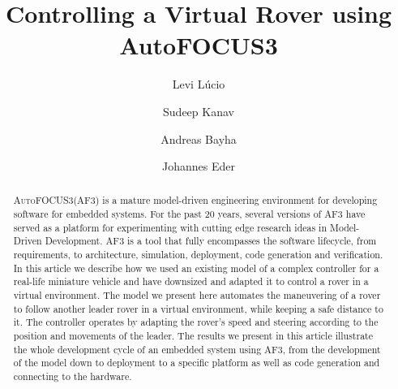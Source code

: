 \documentclass[runningheads]{llncs}
\newcommand{\af}{\textsc{AF3}\xspace}
\newcommand{\autofocus}{\textsc{AutoFOCUS3}\xspace}
\begin{document}
 
% 
\title{Controlling a Virtual Rover using AutoFOCUS3}
%
%
\author{Levi L\'ucio \and
Sudeep Kanav \and Andreas Bayha \and Johannes Eder} 
%
%
%
\maketitle              %
%
\begin{abstract}
\autofocus (\af) is a mature model-driven engineering environment for developing
software for embedded systems. For the past 20 years, several versions of \af
have served as a platform for experimenting with cutting edge research ideas in
Model-Driven Development.
\af is a tool that fully encompasses the software lifecycle, from requirements,
to architecture, simulation, deployment, code generation and verification. In
this article we describe how we used an existing model of a complex controller
for a real-life miniature vehicle and have downsized and adapted it to control a rover in a
virtual environment. The model we present here automates the maneuvering
of a rover to follow another leader rover in a virtual environment, while
keeping a safe distance to it. The controller operates by adapting the rover's
speed and steering according to the position and movements of the leader.
The results we present in this article illustrate the whole development cycle of
an embedded system using \af, from the development of the model down to
deployment to a specific platform as well as code generation and connecting to
the hardware. 
 
\end{abstract}
  




%  
 

 


 

 

\end{document}
